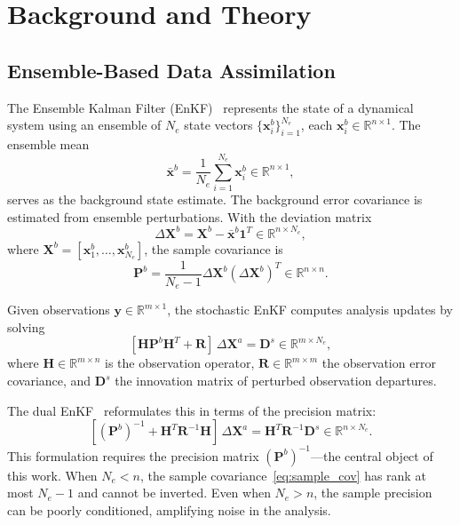 \section{Background and Theory}
\label{sec:background}

\subsection{Ensemble-Based Data Assimilation}
\label{sec:enkf}

The Ensemble Kalman Filter (EnKF)~\cite{evensen2003ensemble} represents the state of a dynamical system using an ensemble of $N_e$ state vectors $\{\mathbf{x}_i^b\}_{i=1}^{N_e}$, each $\mathbf{x}_i^b \in \mathbb{R}^{n \times 1}$. The ensemble mean
\begin{equation}
\bar{\mathbf{x}}^b = \frac{1}{N_e} \sum_{i=1}^{N_e} \mathbf{x}_i^b \in \mathbb{R}^{n \times 1},
\end{equation}
serves as the background state estimate. The background error covariance is estimated from ensemble perturbations. With the deviation matrix
\begin{equation}
\label{eq:deviation}
\Delta\mathbf{X}^b = \mathbf{X}^b - \bar{\mathbf{x}}^b \mathbf{1}^T \in \mathbb{R}^{n \times N_e},
\end{equation}
where $\mathbf{X}^b = [\mathbf{x}_1^b, \ldots, \mathbf{x}_{N_e}^b]$, the sample covariance is
\begin{equation}
\label{eq:sample_cov}
\mathbf{P}^b = \frac{1}{N_e - 1} \Delta\mathbf{X}^b (\Delta\mathbf{X}^b)^T \in \mathbb{R}^{n \times n}.
\end{equation}

Given observations $\mathbf{y} \in \mathbb{R}^{m \times 1}$, the stochastic EnKF computes analysis updates by solving
\begin{equation}
\label{eq:stochastic_enkf}
[\mathbf{H}\mathbf{P}^b\mathbf{H}^T + \mathbf{R}] \, \Delta\mathbf{X}^a = \mathbf{D}^s \in \mathbb{R}^{m \times N_e},
\end{equation}
where $\mathbf{H} \in \mathbb{R}^{m \times n}$ is the observation operator, $\mathbf{R} \in \mathbb{R}^{m \times m}$ the observation error covariance, and $\mathbf{D}^s$ the innovation matrix of perturbed observation departures.

The dual EnKF~\cite{nino2018ensemble} reformulates this in terms of the precision matrix:
\begin{equation}
\label{eq:dual_enkf}
[(\mathbf{P}^b)^{-1} + \mathbf{H}^T\mathbf{R}^{-1}\mathbf{H}] \, \Delta\mathbf{X}^a = \mathbf{H}^T\mathbf{R}^{-1}\mathbf{D}^s \in \mathbb{R}^{n \times N_e}.
\end{equation}
This formulation requires the precision matrix $(\mathbf{P}^b)^{-1}$---the central object of this work. When $N_e < n$, the sample covariance~\eqref{eq:sample_cov} has rank at most $N_e - 1$ and cannot be inverted. Even when $N_e > n$, the sample precision can be poorly conditioned, amplifying noise in the analysis.

